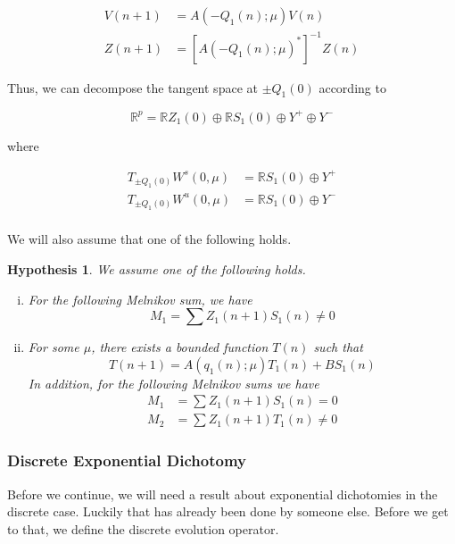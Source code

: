 \documentclass[12pt]{article}
\def\R{{\mathbb R}}
\newtheorem{hypothesis}{Hypothesis}
\begin{document}
\begin{align}
V(n+1) &= A(-Q_1(n); \mu) V(n) \label{minusvareq} \\
Z(n+1) &= [A(-Q_1(n); \mu)^*]^{-1} Z(n) \label{minusadjvareq}
\end{align}

Thus, we can decompose the tangent space at $\pm Q_1(0)$ according to

\begin{equation}\label{tangentdecomp}
\R^p = \R Z_1(0) \oplus \R S_1(0) \oplus Y^+ \oplus Y^-
\end{equation}

where 

\begin{align*}
T_{\pm Q_1(0)}W^s(0, \mu) &= \R S_1(0) \oplus Y^+ \\
T_{\pm Q_1(0)}W^u(0, \mu) &= \R S_1(0) \oplus Y^- \\
\end{align*}

We will also assume that one of the following holds.

\begin{hypothesis}\label{melnikovhyp}
We assume one of the following holds.
\begin{enumerate}[(i)]
\item For the following Melnikov sum, we have
\[
M_1 = \sum Z_1(n+1) S_1(n) \neq 0
\]
\item For some $\mu$, there exists a bounded function $T(n)$ such that 
\[
T(n+1) = A(q_1(n); \mu) T_1(n) + B S_1(n)
\]
In addition, for the following Melnikov sums we have
\begin{align*}
M_1 &= \sum Z_1(n+1) S_1(n) = 0 \\
M_2 &= \sum Z_1(n+1) T_1(n) \neq 0 
\end{align*}
\end{enumerate}
\end{hypothesis}

\subsubsection{Discrete Exponential Dichotomy}

Before we continue, we will need a result about exponential dichotomies in the discrete case. Luckily that has already been done by someone else. Before we get to that, we define the discrete evolution operator.
\end{document}
